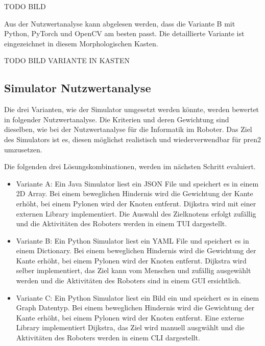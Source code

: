 TODO BILD

Aus der Nutzwertanalyse kann abgelesen werden, dass die Variante B mit Python, PyTorch und OpenCV am besten passt. Die detaillierte Variante ist eingezeichnet in diesem Morphologischen Kasten.

TODO BILD VARIANTE IN KASTEN

\subsection{Simulator Nutzwertanalyse}

Die drei Varianten, wie der Simulator umgesetzt werden könnte, werden bewertet in folgender Nutzwertanalyse. Die Kriterien und deren Gewichtung sind dieselben, wie bei der Nutzwertanalyse für die Informatik im Roboter. Das Ziel des Simulators ist es, diesen möglichst realistisch und wiederverwendbar für \acrshort{pren2} umzusetzen.


Die folgenden drei Lösungskombinationen, werden im nächsten Schritt evaluiert.

\begin{itemize}
    \item Variante A: Ein Java Simulator liest ein JSON File und speichert es in einem 2D Array. Bei einem beweglichen Hindernis wird die Gewichtung der Kante erhöht, bei einem Pylonen wird der Knoten entfernt. Dijkstra wird mit einer externen Library implementiert. Die Auswahl des Zielknotens erfolgt zufällig und die Aktivitäten des Roboters werden in einem TUI dargestellt.
    \item Variante B: Ein Python Simulator liest ein YAML File und speichert es in einem Dictionary. Bei einem beweglichen Hindernis wird die Gewichtung der Kante erhöht, bei einem Pylonen wird der Knoten entfernt. Dijkstra wird selber implementiert, das Ziel kann vom Menschen und zufällig ausgewählt werden und die Aktivitäten des Roboters sind in einem GUI ersichtlich.
    \item Variante C: Ein Python Simulator liest ein Bild ein und speichert es in einem Graph Datentyp. Bei einem beweglichen Hindernis wird die Gewichtung der Kante erhöht, bei einem Pylonen wird der Knoten entfernt. Eine externe Library implementiert Dijkstra, das Ziel wird manuell ausgwählt und die Aktivitäten des Roboters werden in einem CLI dargestellt.
\end{itemize}

